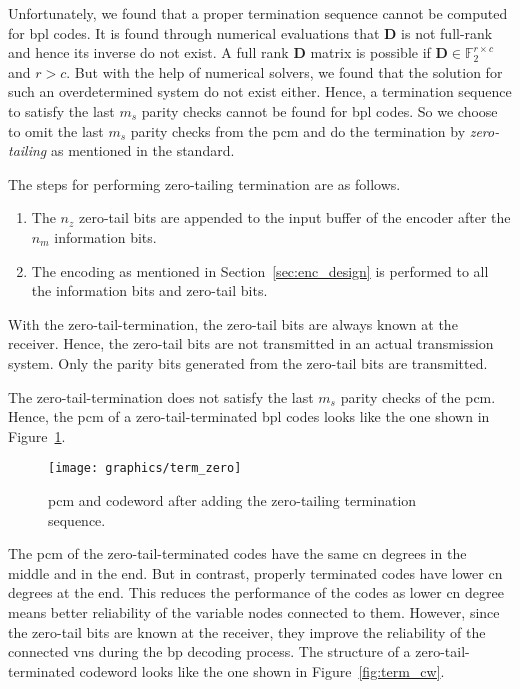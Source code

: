 Unfortunately, we found that a proper termination sequence cannot be computed for \ac{bpl} codes. It is found through numerical evaluations that $\mathbf{D}$ is not full-rank and hence its inverse do not exist. A full rank $\mathbf{D}$ matrix is possible if $\mathbf{D}\in\mathbb{F}_2^{r\times c}$ and $r>c$. But with the help of numerical solvers, we found that the solution for such an overdetermined system do not exist either. Hence, a termination sequence to satisfy the last $m_s$ parity checks cannot be found for \ac{bpl} codes. So we choose to omit the last $m_s$ parity checks from the \ac{pcm} and do the termination by \emph{zero-tailing} as mentioned in the standard.

The steps for performing zero-tailing termination are as follows.
\begin{enumerate}
  \item The $n_z$ zero-tail bits are appended to the input buffer of the encoder after the $n_m$ information bits.
  \item The encoding as mentioned in Section~\ref{sec:enc_design} is performed to all the information bits and zero-tail bits.
\end{enumerate}
With the zero-tail-termination, the zero-tail bits are always known at the receiver. Hence, the zero-tail bits are not transmitted in an actual transmission system. Only the parity bits generated from the zero-tail bits are transmitted.

The zero-tail-termination does not satisfy the last $m_s$ parity checks of the \ac{pcm}. Hence, the \ac{pcm} of a zero-tail-terminated \ac{bpl} codes looks like the one shown in Figure~\ref{fig:pcm_zero}.
\begin{figure}[htbp]
  \centering
  \texttt{[image: graphics/term\_zero]}
  \caption{\ac{pcm} and codeword after adding the zero-tailing termination sequence.}
  \label{fig:pcm_zero}
\end{figure}

The \ac{pcm} of the zero-tail-terminated codes have the same \ac{cn} degrees in the middle and in the end. But in contrast, properly terminated codes have lower \ac{cn} degrees at the end. This reduces the performance of the codes as lower \ac{cn} degree means better reliability of the variable nodes connected to them. However, since the zero-tail bits are known at the receiver, they improve the reliability of the connected \acp{vn} during the \ac{bp} decoding process. The structure of a zero-tail-terminated codeword looks like the one shown in Figure~\ref{fig:term_cw}.


